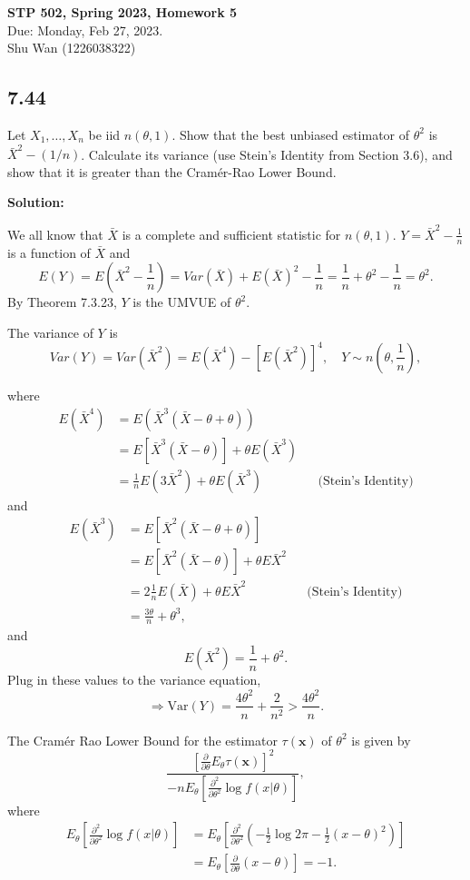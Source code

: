 \documentclass[11pt]{article}
\newcommand{\x}{\mathbf{x}}
\newcommand{\Sol}{\par {\bf Solution:}}
\newcommand{\sample}[1]{#1_1 , \dots , #1_n}
\newcommand{\var}{\textrm{Var}}
\newcommand{\Partial}[1]{\frac{\partial}{\partial #1}}
\newcommand{\SecPartial}[1]{\frac{\partial^2}{\partial {#1}^2}}
\begin{document}
\begin{center}
\Large{
\textbf{STP 502, Spring 2023, Homework 5} \\
Due: Monday, Feb 27, 2023. \\
Shu Wan (1226038322)
}
\end{center}
\subsection*{7.44}
Let $\sample{X}$ be iid $n(\theta, 1)$. Show that the best unbiased estimator of $\theta^2$ is $\bar X^2 - (1/ n)$.
Calculate its variance (use Stein's Identity from Section 3.6), and show that it is greater than the Cram\'{e}r-Rao Lower Bound.

\Sol

We all know that $\bar X$ is a complete and sufficient statistic for $n(\theta, 1)$. $Y = \bar X^2 - \frac{1}{n}$ is a function of $\bar X$ and 
\[
E(Y) = E(\bar X^2 - \frac{1}{n}) =  Var(\bar X) + E(\bar X)^2 - \frac{1}{n} = \frac{1}{n} + \theta^2 - \frac{1}{n} = \theta^2.
\]
By Theorem 7.3.23, $Y$ is the UMVUE of $\theta^2$.

The variance of $Y$ is 
\[
Var(Y) = Var(\bar X^2) = E(\bar X^4) - [E(\bar X^2)]^4, \quad Y \sim n(\theta, \frac{1}{n}),
\]

where
\begin{align*}
    E(\bar X^4) &= E(\bar X^3(\bar X - \theta + \theta)) \\
    &= E[\bar X^3 (\bar X - \theta)] + \theta E(\bar X^3) \\
    &= \frac{1}{n}E(3 \bar X^2) + \theta E(\bar X^3) && \text{(Stein's Identity)}
\end{align*}
and
\begin{align*}
E(\bar X^3) &= E[\bar X^2(\bar X - \theta + \theta)] \\
&= E[\bar X^2 (\bar X - \theta)] + \theta E\bar X^2 \\
&= 2\frac{1}{n}E(\bar X) + \theta E\bar X^2 && \text{(Stein's Identity)} \\
&= \frac{3\theta}{n} + \theta^3,
\end{align*}
and
\[
E(\bar X^2) = \frac{1}{n} + \theta^2.
\]
Plug in these values to the variance equation,
\[
\Longrightarrow \var(Y) =  \frac{4\theta^2}{n} + \frac{2}{n^2} > \frac{4\theta^2}{n}.
\]

The Cram\'{e}r Rao Lower Bound for the estimator $\tau(\x)$ of $\theta^2$ is given by
\[
\frac{[\Partial \theta E_\theta\tau(\x)]^2}{-nE_\theta [\SecPartial{\theta} \log f(x|\theta)]},
\]
where
\begin{align*}
    E_\theta [\SecPartial{\theta} \log f(x|\theta)] &= E_\theta [\SecPartial{\theta} (-\frac{1}{2} \log 2\pi - \frac{1}{2}(x-\theta)^2)] \\
    &= E_\theta[\Partial \theta (x-\theta)] = -1.
\end{align*}
\end{document}
